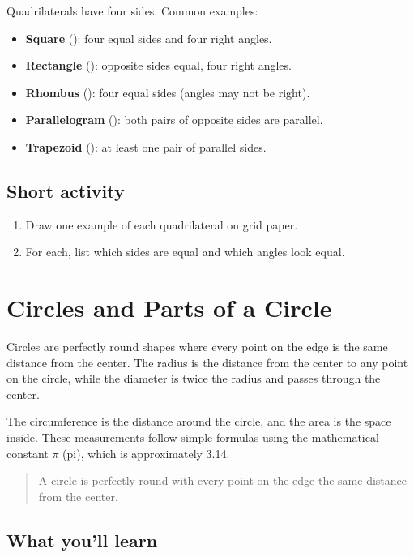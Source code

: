 Quadrilaterals have four sides. Common examples:
\begin{itemize}
  \item \textbf{Square} (): four equal sides and four right angles.
  \item \textbf{Rectangle} (): opposite sides equal, four right angles.
  \item \textbf{Rhombus} (): four equal sides (angles may not be right).
  \item \textbf{Parallelogram} (): both pairs of opposite sides are parallel.
  \item \textbf{Trapezoid} (): at least one pair of parallel sides.
\end{itemize}

\subsection{Short activity}

\begin{enumerate}
  \item Draw one example of each quadrilateral on grid paper.
  \item For each, list which sides are equal and which angles look equal.
\end{enumerate}


\section{Circles and Parts of a Circle}

Circles are perfectly round shapes where every point on the edge is the same
distance from the center. The radius is the distance from the center to any point
on the circle, while the diameter is twice the radius and passes through the
center.

The circumference is the distance around the circle, and the area is the space
inside. These measurements follow simple formulas using the mathematical constant
$\pi$ (pi), which is approximately 3.14.

\blockquote{A circle is perfectly round with every point on the edge the same
distance from the center.}

\subsection{What you'll learn}

